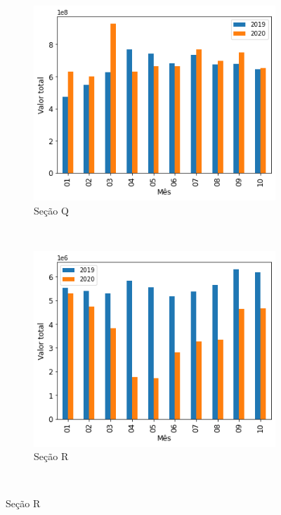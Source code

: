 \begin{figure}[htb]
\begin{subfigure}[b]{0.45\textwidth}
        \includegraphics[scale=0.45]{images/base-de-dados-17.Q-comparacao-valor-total-por-secao.png}
        \caption{Seção Q}
        \label{fig:pandemia:descritiva-17.Q-comparacao-valor-total-por-secao}
    \end{subfigure} ~ \quad
    \begin{subfigure}[b]{0.45\textwidth}
        \includegraphics[scale=0.45]{images/base-de-dados-17.R-comparacao-valor-total-por-secao.png}
        \caption{Seção R}
        \label{fig:pandemia:descritiva-17.R-comparacao-valor-total-por-secao}
    \end{subfigure} ~ \\
    \fautor
\end{figure}

